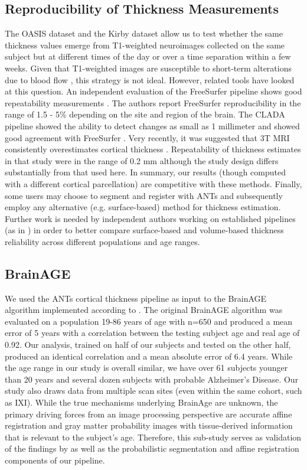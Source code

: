 \subsection{Reproducibility of Thickness Measurements}
The OASIS dataset and the Kirby dataset allow us to test whether the same
thickness values emerge from T1-weighted
neuroimages collected on the same subject but at different times of
the day or over a time separation within a few weeks.  Given that
T1-weighted images are susceptible to short-term alterations due to
blood flow \cite{Franklin2013,Salgado-Pineda2006,Yamasue2007}, this strategy is not ideal.  However, related
tools have looked at this question. An independent evaluation of the FreeSurfer pipeline shows good
repeatability measurements \cite{jovicich2013}. The authors report
FreeSurfer reproducibility in the range of 1.5 - 5\% depending on the
site and region of the brain.  The CLADA pipeline showed the ability to detect
changes as small as 1 millimeter and showed good agreement with
FreeSurfer \cite{nakamura2011}. Very recently, it was suggested that 3T MRI
consistently overestimates cortical thickness \cite{lusebrink2013}.
Repeatability of thickness estimates in that study were in the range
of 0.2 mm although the study design differs substantially from that used here.
In summary, our results (though computed
with a different cortical parcellation) are competitive with these
methods.  Finally, some users may choose to segment and register
with ANTs and subsequently employ any alternative (e.g. surface-based)
method for thickness estimation.  Further work is needed by
independent authors working on established pipelines (as in \cite{lusebrink2013,jovicich2013}) in order to
better compare surface-based and volume-based thickness reliability
across different populations and age ranges. 

\subsection{BrainAGE} 
We used the ANTs cortical thickness pipeline as input to the BrainAGE
algorithm implemented according to \cite{franke2010}.  The original
BrainAGE algorithm was evaluated on a population 19-86 years of age
with n=650 and produced a mean error of 5 years with a correlation
between the testing subject age and real age of 0.92.  Our analysis,
trained on half of our subjects and tested on the other half, produced
an identical correlation and a mean absolute error of 6.4 years.
While the age range in our study is overall similar, we have over
61 subjects younger than 20 years and several dozen subjects with
probable Alzheimer's Disease.  Our study also draws data from multiple
scan sites (even within the same cohort, such as IXI).  
While the true mechanisms underlying BrainAge are unknown, the
primary driving forces from an image processing perspective are accurate affine registration and gray
matter probability images with tissue-derived information that is
relevant to the subject's age.  Therefore, this sub-study serves as
validation of the findings by \cite{franke2010} as well as the
probabilistic segmentation and affine registration components of our
pipeline.

